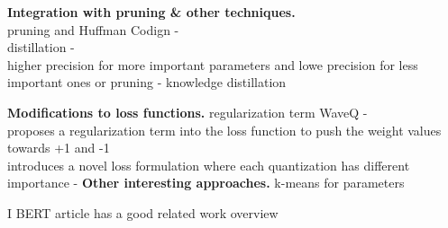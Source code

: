 \noindent
\textbf{Integration with pruning \& other techniques.}\\
pruning and Huffman Codign - \cite{han2016deepcompression}\\
distillation - \cite{polino2018modelcompression}\\
higher precision for more important parameters and lowe precision for less important ones or pruning - \cite{soroosh2018adaptive}
knowledge distillation \cite{DBLP:conf/eccv/WeiPQOY18}

\noindent
\textbf{Modifications to loss functions.}
regularization term WaveQ - \cite{DBLP:journals/corr/abs-2003-00146}\\
proposes a regularization term into the loss function to push the weight values towards +1 and -1 \cite{DBLP:conf/aaai/TangH017}\\
introduces a novel loss formulation where each quantization has different importance - \cite{DBLP:conf/iclr/HouYK17}
\noindent
\textbf{Other interesting approaches.}
k-means for parameters \cite{yunchao2014compressing}

I BERT article has a good related work overview